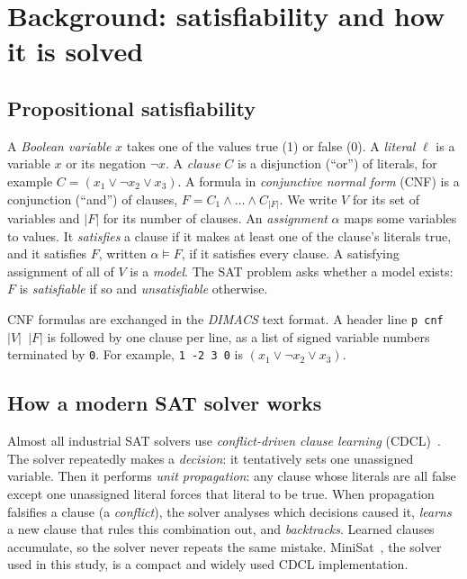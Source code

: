 \documentclass[11pt,a4paper]{article}
\begin{document}
\section{Background: satisfiability and how it is solved}
\label{sec:background}

\subsection{Propositional satisfiability}
A \emph{Boolean variable} $x$ takes one of the values \textsf{true} (1) or \textsf{false}
(0). A \emph{literal} $\ell$ is a variable $x$ or its negation $\neg x$. A \emph{clause} $C$
is a disjunction (``or'') of literals, for example $C = (x_1 \lor \neg x_2 \lor x_3)$. A
formula in \emph{conjunctive normal form} (CNF) is a conjunction (``and'') of clauses,
$F = C_1 \land \dots \land C_{|F|}$. We write $V$ for its set of variables and $|F|$ for its
number of clauses. An \emph{assignment} $\alpha$ maps some variables to values. It
\emph{satisfies} a clause if it makes at least one of the clause's literals true, and it
satisfies $F$, written $\alpha \models F$, if it satisfies every clause. A satisfying
assignment of all of $V$ is a \emph{model}. The SAT problem asks whether a model exists:
$F$ is \emph{satisfiable} if so and \emph{unsatisfiable} otherwise.

CNF formulas are exchanged in the \emph{DIMACS} text format. A header line
\texttt{p cnf $|V|$ $|F|$} is followed by one clause per line, as a list of signed variable
numbers terminated by \texttt{0}. For example, \texttt{1 -2 3 0} is
$(x_1\lor\neg x_2\lor x_3)$.

\subsection{How a modern SAT solver works}
Almost all industrial SAT solvers use \emph{conflict-driven clause learning}
(CDCL)~\cite{marques1999grasp}. The solver repeatedly makes a \emph{decision}: it
tentatively sets one unassigned variable. Then it performs \emph{unit propagation}: any
clause whose literals are all false except one unassigned literal forces that literal to
be true. When propagation falsifies a clause (a \emph{conflict}), the solver analyses which
decisions caused it, \emph{learns} a new clause that rules this combination out, and
\emph{backtracks}. Learned clauses accumulate, so the solver never repeats the same
mistake. MiniSat~\cite{een2003minisat}, the solver used in this study, is a compact and
widely used CDCL implementation.
\end{document}
